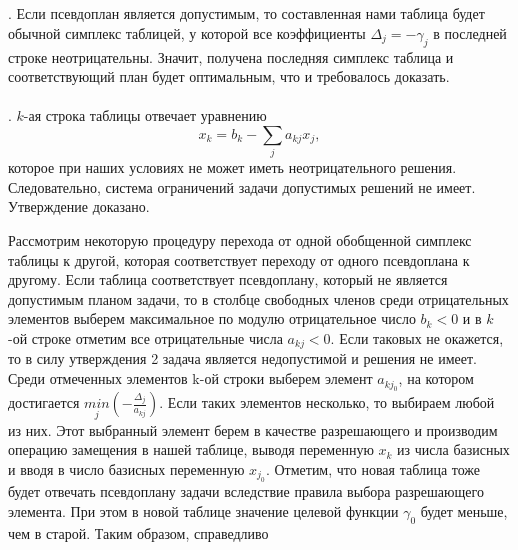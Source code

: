  \\

 \\

. Если псевдоплан является допустимым, то составленная нами таблица будет обычной симплекс таблицей, у которой все коэффициенты $\Delta_j = -\gamma_j$ в последней строке неотрицательны. Значит, получена последняя симплекс таблица и соответствующий план будет оптимальным, что и требовалось доказать. \\

 \\

. $k$-ая строка таблицы отвечает уравнению
\[
x_k = b_k - \sum_{j} a_{kj}x_j,
\]
которое при наших условиях не может иметь неотрицательного решения. Следовательно, система ограничений задачи допустимых решений не имеет. Утверждение доказано.

Рассмотрим некоторую процедуру перехода от одной обобщенной симплекс таблицы к другой, которая соответствует переходу от одного псевдоплана к другому. Если таблица соответствует псевдоплану, который не является допустимым планом задачи, то в столбце свободных членов среди отрицательных элементов выберем максимальное по модулю отрицательное число $b_k < 0$ и в $k$-ой строке отметим все отрицательные числа $a_{kj} < 0$. Если таковых не окажется, то в силу утверждения 2 задача является недопустимой и решения не имеет. Среди отмеченных элементов k-ой строки выберем элемент $a_{kj_0}$, на котором достигается  $\underset{j}{min}\left(-\frac{\Delta_j}{a_{kj}}\right)$. Если таких элементов несколько, то выбираем любой из них. Этот выбранный элемент берем в качестве разрешающего и производим операцию замещения в нашей таблице, выводя переменную $x_k$ из числа базисных и вводя в число базисных переменную $x_{j_0}$. Отметим, что новая таблица тоже будет отвечать псевдоплану задачи вследствие правила выбора разрешающего элемента. При этом в новой таблице значение целевой функции $\gamma_0$ будет меньше, чем в старой. Таким образом, справедливо \\

